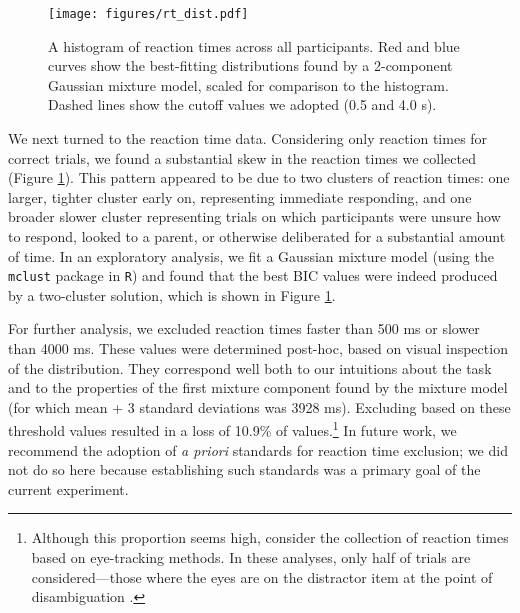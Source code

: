 \documentclass[man,noapacite]{apa2}
\begin{document}
\begin{figure}[t] 
  \begin{center} 
    \texttt{[image: figures/rt\_dist.pdf]} 
    \caption{\label{fig:rtdist} A histogram of reaction times across all participants. Red and blue curves show the best-fitting distributions found by a 2-component Gaussian mixture model, scaled for comparison to the histogram. Dashed lines show the cutoff values we adopted (0.5 and 4.0 s).}
  \end{center} 
\end{figure}

We next turned to the reaction time data. Considering only reaction times for correct trials, we found a substantial skew in the reaction times we collected (Figure \ref{fig:rtdist}). This pattern appeared to be due to two clusters of reaction times: one larger, tighter cluster early on, representing immediate responding, and one broader slower cluster representing trials on which participants were unsure how to respond, looked to a parent, or otherwise deliberated for a substantial amount of time. In an exploratory analysis, we fit a Gaussian mixture model (using the \texttt{mclust} package in \texttt{R}) and found that the best BIC values were indeed produced by a two-cluster solution, which is shown in Figure \ref{fig:rtdist}. 

For further analysis, we excluded reaction times faster than 500 ms or slower than 4000 ms. These values were determined post-hoc, based on visual inspection of the distribution. They correspond well both to our intuitions about the task and to the properties of the first mixture component found by the mixture model (for which mean + 3 standard deviations was 3928 ms). Excluding based on these threshold values resulted in a loss of 10.9\% of values.\footnote{Although this proportion seems high, consider the collection of reaction times based on eye-tracking methods. In these analyses, only half of trials are considered---those where the eyes are on the distractor item at the point of disambiguation \cite{fernald2008}.} In future work, we recommend the adoption of {\it a priori} standards for reaction time exclusion; we did not do so here because establishing such standards was a primary goal of the current experiment. 
\end{document}
